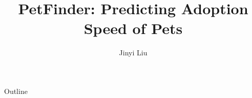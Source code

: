 \documentclass[notheorems]{beamer}
\title[]{PetFinder: Predicting Adoption Speed of Pets}
\author{Jinyi Liu}
\institute{Business Analytics \& Statistics}
\begin{document}



\begin{frame}
\titlepage
\end{frame}

\begin{frame}{Outline}
    \tableofcontents %
\end{frame}





\end{document}
